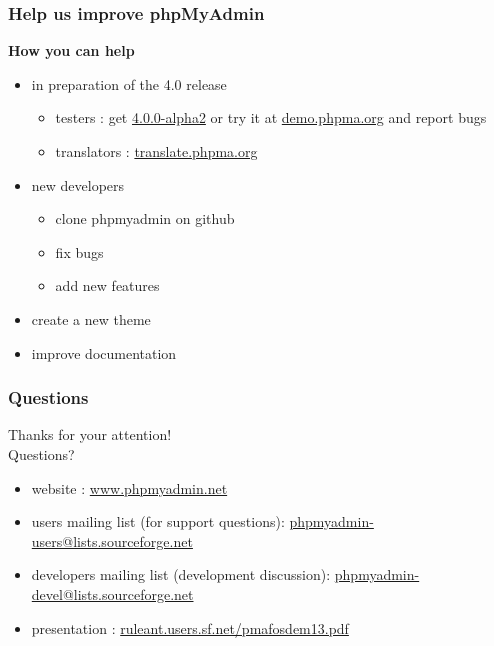 \documentclass[14pt]{beamer}
\begin{document}
  \begin{frame}
  \frametitle{Help us improve phpMyAdmin}
    \textbf{{\color{PmaOlive}How you can help}}
    \pause
    \begin{itemize}[<+->]
      \item in preparation of the 4.0 release
        \begin{itemize}[<+->]
		\item testers : get \href{http://www.phpmyadmin.net/}{4.0.0-alpha2} or try it at \href{http://demo.phpma.org/}{demo.phpma.org} and report bugs
	  \item translators : \href{http://translate.phpma.org/}{translate.phpma.org}
	\end{itemize}
      \item new developers
	\begin{itemize}[<+->]
          \item clone phpmyadmin on github
          \item fix bugs
          \item add new features
	\end{itemize}
      \item create a new theme
      \item improve documentation
    \end{itemize}
  \end{frame}
  \begin{frame}
  \frametitle{Questions}
    Thanks for your attention!\\
    Questions?
    \begin{itemize}
      \item website : \href{http://www.phpmyadmin.net/}{www.phpmyadmin.net}
      \item users mailing list (for support questions): \href{mailto:phpmyadmin-users@lists.sourceforge.net}{phpmyadmin-users@lists.sourceforge.net}
      \item developers mailing list (development discussion): \href{mailto:phpmyadmin-devel@lists.sourceforge.net}{phpmyadmin-devel@lists.sourceforge.net}
      \item presentation : \href{http://ruleant.users.sf.net/pmafosdem13.pdf}{ruleant.users.sf.net/pmafosdem13.pdf}
    \end{itemize}
  \end{frame}
\end{document}
